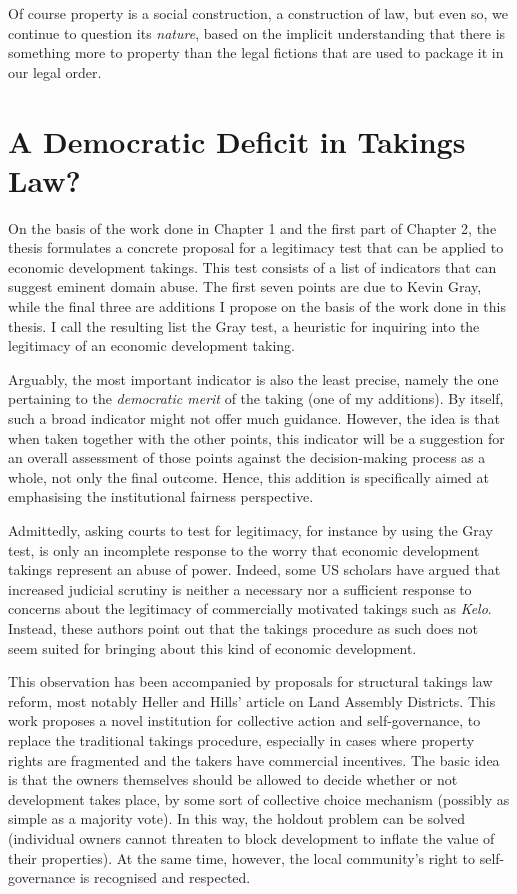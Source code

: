 {Of course property is a social construction, a construction of law, but even so, we continue to question its {\it nature}, based on the implicit understanding that there is something more to property than the legal fictions that are used to package it in our legal order.
}

\section{A Democratic Deficit in Takings Law?}


On the basis of the work done in Chapter 1 and the first part of Chapter 2, the thesis formulates a concrete proposal for a legitimacy test that can be applied to economic development takings. This test consists of a list of indicators that can suggest eminent domain abuse. The first seven points are due to Kevin Gray, while the final three are additions I propose on the basis of the work done in this thesis. I call the resulting list the Gray test, a heuristic for inquiring into the legitimacy of an economic development taking.

Arguably, the most important indicator is also the least precise, namely the one pertaining to the {\it democratic merit} of the taking (one of my additions). By itself, such a broad indicator might not offer much guidance. However, the idea is that when taken together with the other points, this indicator will be a suggestion for an overall assessment of those points against the decision-making process as a whole, not only the final outcome. Hence, this addition is specifically aimed at emphasising the institutional fairness perspective.

Admittedly, asking courts to test for legitimacy, for instance by using the Gray test, is only an incomplete response to the worry that economic development takings represent an abuse of power. Indeed, some US scholars have argued that increased judicial scrutiny is neither a necessary nor a sufficient response to concerns about the legitimacy of commercially motivated takings such as {\it Kelo}. Instead, these authors point out that the takings procedure as such does not seem suited for bringing about this kind of economic development.

This observation has been accompanied by proposals for structural takings law reform, most notably Heller and Hills' article on Land Assembly Districts. This work proposes a novel institution for collective action and self-governance, to replace the traditional takings procedure, especially in cases where property rights are fragmented and the takers have commercial incentives. The basic idea is that the owners themselves should be allowed to decide whether or not development takes place, by some sort of collective choice mechanism (possibly as simple as a majority vote). In this way, the holdout problem can be solved (individual owners cannot threaten to block development to inflate the value of their properties). At the same time, however, the local community's right to self-governance is recognised and respected.
 
